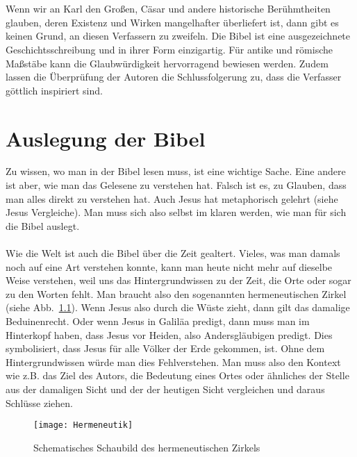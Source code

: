 \\~\\
Wenn wir an Karl den Großen, Cäsar und andere historische Berühmtheiten glauben, deren Existenz und Wirken mangelhafter überliefert ist, dann gibt es keinen Grund, an diesen Verfassern zu zweifeln. Die Bibel ist eine ausgezeichnete Geschichtsschreibung und in ihrer Form einzigartig. Für antike und römische Maßstäbe kann die Glaubwürdigkeit hervorragend bewiesen werden. Zudem lassen die Überprüfung der Autoren die Schlussfolgerung zu, dass die Verfasser göttlich inspiriert sind.


\chapter{Auslegung der Bibel}
Zu wissen, wo man in der Bibel lesen muss, ist eine wichtige Sache. Eine andere ist aber, wie man das Gelesene zu verstehen hat. Falsch ist es,  zu Glauben, dass man alles direkt zu verstehen hat. Auch Jesus hat metaphorisch gelehrt (siehe Jesus Vergleiche). Man muss sich also selbst im klaren werden, wie man für sich die Bibel auslegt.
\\~\\
Wie die Welt ist auch die Bibel über die Zeit gealtert. Vieles, was man damals noch auf eine Art verstehen konnte, kann man heute nicht mehr auf dieselbe Weise verstehen, weil uns das Hintergrundwissen zu der Zeit, die Orte oder sogar zu den Worten fehlt. Man braucht also den sogenannten hermeneutischen Zirkel (siehe Abb.\ \ref{Hermeneutik}). Wenn Jesus also durch die Wüste zieht, dann gilt das damalige Beduinenrecht. Oder wenn Jesus in Galiläa predigt, dann muss man im Hinterkopf haben, dass Jesus vor Heiden, also Andersgläubigen predigt. Dies symbolisiert, dass Jesus für alle Völker der Erde gekommen, ist. Ohne dem Hintergrundwissen würde man dies Fehlverstehen. Man muss also den Kontext wie z.B. das Ziel des Autors, die Bedeutung eines Ortes oder ähnliches der Stelle aus der damaligen Sicht und der der heutigen Sicht vergleichen und daraus Schlüsse ziehen.
\begin{figure}[h]
    \begin{center}
        \texttt{[image: Hermeneutik]}
        \caption{Schematisches Schaubild des hermeneutischen Zirkels}\label{Hermeneutik}
    \end{center}
\end{figure}
